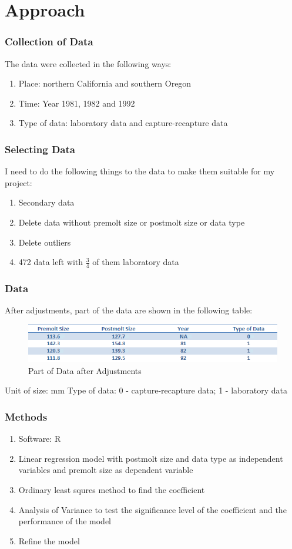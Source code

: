 \documentclass[compress,handout,10pt]{beamer}
\let\olditem\item
\renewcommand{\item}{\setlength{\itemsep}{0.5\baselineskip}\olditem}
\begin{document}
\section{Approach}
\begin{frame}
    \frametitle{Collection of Data}
    The data were collected in the following ways:
     \begin{enumerate}
         \item Place: northern California and southern Oregon
         \item Time: Year 1981, 1982 and 1992
         \item Type of data: laboratory data and capture-recapture data
     \end{enumerate}
\end{frame}

\begin{frame}
    \frametitle{Selecting Data}
    I need to do the following things to the data to make them suitable for my project:
     \begin{enumerate}
         \item Secondary data
         \item Delete data without premolt size or postmolt size or data type
         \item Delete outliers
         \item 472 data left with $\frac{3}{4}$ of them laboratory data
     \end{enumerate}
\end{frame}

\begin{frame}
    \frametitle{Data}
    After adjustments, part of the data are shown in the following table:
    \begin{figure}
        \begin{center}
	    \includegraphics[width=\textwidth]{data.png}
	\end{center}
	\caption{Part of Data after Adjustments}
    \end{figure}
    Unit of size: mm
    Type of data: 0 - capture-recapture data; 1 - laboratory data
\end{frame}

\begin{frame}
    \frametitle{Methods}
     \begin{enumerate}
         \item Software: R
         \item Linear regression model with postmolt size and data type as independent variables and premolt size as dependent variable
         \item Ordinary least squres method to find the coefficient
         \item Analysis of Variance to test the significance level of the coefficient and the performance of the model
         \item Refine the model
     \end{enumerate}
\end{frame}
\end{document}
